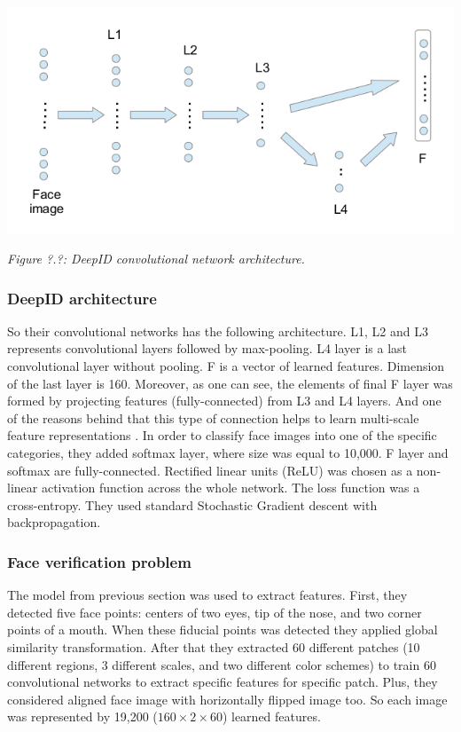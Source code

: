 \documentclass[paper=a4, fontsize=11pt]{scrartcl} %
\numberwithin{equation}{section} %
\numberwithin{figure}{section} %
\numberwithin{table}{section} %
\begin{document}
\begin{center}
\includegraphics[scale=0.5]{pictures/deepid.png}
\par\large\textit{Figure ?.?: DeepID convolutional network architecture.}
\end{center}

\subsubsection{DeepID architecture}

So their convolutional networks has the following architecture. L1, L2 and L3 represents convolutional layers followed by max-pooling. L4 layer is a last convolutional layer without pooling. F is a vector of learned features. Dimension of the last layer is 160. Moreover, as one can see, the elements of final F layer was formed by projecting features (fully-connected) from L3 and L4 layers. And one of the reasons behind that this type of connection helps to learn multi-scale feature representations \cite{sermanet2011traffic}.  In order to classify face images into one of the specific categories, they added softmax layer, where size was equal to 10,000. F layer and softmax are fully-connected. Rectified linear units (ReLU) was chosen as a non-linear activation function across the whole network. The loss function was a cross-entropy. They used standard Stochastic Gradient descent with backpropagation.

\subsubsection{Face verification problem}

The model from previous section was used to extract features. First, they detected five face points: centers of two eyes, tip of the nose, and two corner points of a mouth. When these fiducial points was detected they applied global similarity transformation. After that they extracted 60 different patches (10 different regions, 3 different scales, and two different color schemes) to train 60 convolutional networks to extract specific features for specific patch. Plus, they considered aligned face image with horizontally flipped image too. So each image was represented by 19,200 ($160\times2\times60$) learned features. \par
\end{document}
